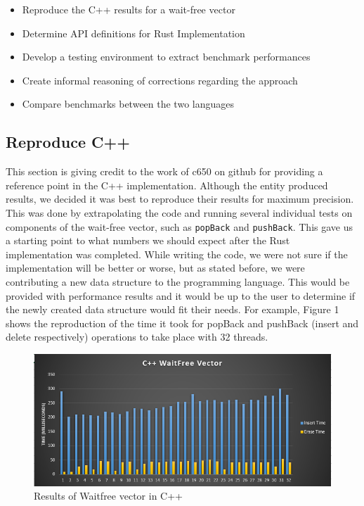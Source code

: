 \documentclass[conference]{IEEEtran}
\begin{document}
    \begin{itemize}
        \item Reproduce the C++ results for a wait-free vector
        \item Determine API definitions for Rust Implementation
        \item Develop a testing environment to extract benchmark performances
        \item Create informal reasoning of corrections regarding the approach
        \item Compare benchmarks between the two languages
    \end{itemize}
    
    \subsection{Reproduce C++}
    
    This section is giving credit to the work of c650 on github for providing a reference point in the C++ implementation. Although the entity produced results, we decided it was best to reproduce their results for maximum precision. This was done by extrapolating the code and running several individual tests on components of the wait-free vector, such as \verb|popBack| and \verb|pushBack|. This gave us a starting point to what numbers we should expect after the Rust implementation was completed. While writing the code, we were not sure if the implementation will be better or worse, but as stated before, we were contributing a new data structure to the programming language. This would be provided with performance results and it would be up to the user to determine if the newly created data structure would fit their needs. For example, Figure 1 shows the reproduction of the time it took for popBack and pushBack (insert and delete respectively) operations to take place with 32 threads. 
    
    \begin{figure}[h]
    \includegraphics[width=\linewidth]{waitfree_rand_cpp.PNG}
    \caption{Results of Waitfree vector in C++}
    \end{figure}
\end{document}
